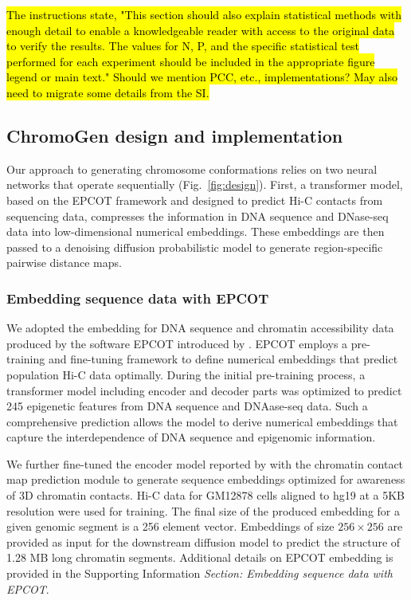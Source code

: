 \documentclass[12pt,letterpaper]{article}
\begin{document}
\hl{The instructions state, "This section should also explain statistical methods with enough detail to enable a knowledgeable reader with access to the original data to verify the results. The values for N, P, and the specific statistical test performed for each experiment should be included in the appropriate figure legend or main text." Should we mention PCC, etc., implementations? May also need to migrate some details from the SI.}

\subsection*{ChromoGen design and implementation}
\label{subsec:AI}
Our approach to generating chromosome conformations relies on two neural networks that operate sequentially (Fig.~\ref{fig:design}). First, a transformer model, based on the EPCOT framework \cite{Zhang2023a} and designed to predict Hi-C contacts from sequencing data, compresses the information in DNA sequence and DNase-seq data into  low-dimensional numerical embeddings.  These embeddings are then passed to a denoising diffusion probabilistic model \cite{Ho2020} to generate region-specific pairwise distance maps. 


\subsubsection*{Embedding sequence data with EPCOT}
\label{subsec:AI:EPCOT}

We adopted the embedding for DNA sequence and chromatin accessibility data produced by the software EPCOT introduced by \textcite{Zhang2023a}. EPCOT employs a pre-training and fine-tuning framework to define numerical embeddings that predict population Hi-C data optimally. During the initial pre-training process, a transformer model including encoder and decoder parts was optimized to predict 245 epigenetic features from DNA sequence and DNAase-seq data. Such a comprehensive prediction allows the model to derive numerical embeddings that capture the interdependence of DNA sequence and epigenomic information. 


We further fine-tuned the encoder model reported by \textcite{Zhang2023a}  with the chromatin contact map prediction module to generate sequence embeddings optimized for awareness of 3D chromatin contacts. Hi-C data for GM12878 cells aligned to hg19 at a 5KB resolution were used for training. The final size of the produced embedding for a given genomic segment is a 256 element vector. Embeddings of size $256 \times 256$ are provided as input for the downstream diffusion model to predict the structure of 1.28 MB long chromatin segments. Additional details on EPCOT embedding is provided in the Supporting Information \emph{Section: Embedding sequence data with EPCOT}.
\end{document}
